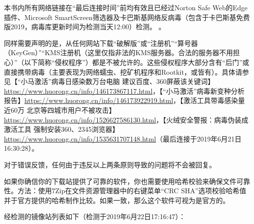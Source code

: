 \documentclass{book}
\begin{document}
\begin{window}
本书内所有网络链接在“最后连接时间”前均有效且已经过Norton Safe Web的Edge插件、Microsoft SmartScreen筛选器及卡巴斯基网络反病毒（包含于卡巴斯基免费版2019，病毒库更新时间为检测当天12:00）检测。 {}。\par 同样需要声明的是，从任何网站下载“破解版”或“注册机”“算号器（KeyGen）”“KMS注册机（这里仅指非法的KMS服务器。合法的服务器不用担心）”（以下简称“侵权程序”）都是不被允许的。这些侵权程序大部分含有“后门”或直接携带病毒（主要表现为网络蠕虫、挖矿机程序和Rootkit，或皆有）。具体请参见【“小马激活”病毒日感染数万台电脑 建议百度、360屏蔽该关键词】\url{https://www.huorong.cn/info/146173867117.html}，【“小马激活”病毒新变种分析报告】\url{https://www.huorong.cn/info/146173922919.html}，【激活工具带毒感染量近60万 北京等四城市用户不被攻击】\url{https://www.huorong.cn/info/1526627586130.html}，【火绒安全警报：病毒伪装成激活工具  强制安装360、2345浏览器】\url{https://www.huorong.cn/info/1535631707148.html}（最后连接于2019年6月21日16:30:28）。\par 对于错误反馈，任何由于违反以上两条原则导致的问题将不会被回复。\par 如果你确信你的下载站提供了可靠的软件，你也需要使用哈希校验来确保文件可靠性。方法：使用7Zip在文件资源管理器中的右键菜单“CRC SHA”选项校验哈希值并于官方提供的哈希制作比较。如果一致，那么这个软件可视为是官方的。
\end{window}
经检测的镜像站列表如下（检测于2019年6月22日17:16:47）：
\end{document}
